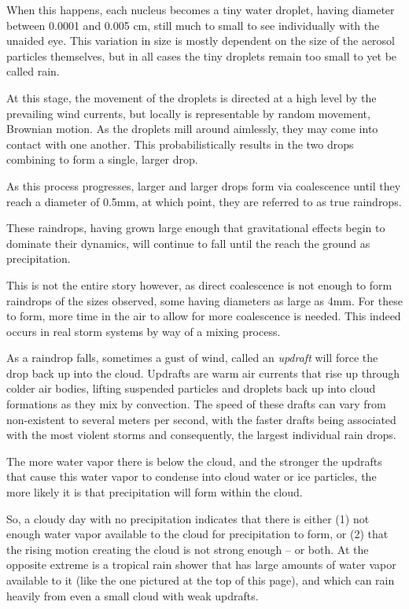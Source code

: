 \documentclass[twocolumn,a4paper,10pt]{article}
\begin{document}
When this happens, each nucleus becomes a tiny water droplet, having diameter
between 0.0001 and 0.005 cm, still much to small to see individually with the
unaided eye. This variation in size is mostly dependent on the size of the
aerosol particles themselves, but in all cases the tiny droplets remain too
small to yet be called rain.

At this stage, the movement of the droplets is directed at a high level by the
prevailing wind currents, but locally is representable by random movement,
Brownian motion. As the droplets mill around aimlessly, they may come into
contact with one another. This probabilistically results in the two drops
combining to form a single, larger drop.

As this process progresses, larger and larger drops form via coalescence until
they reach a diameter of 0.5mm, at which point, they are referred to as
true raindrops.

These raindrops, having grown large enough that gravitational effects begin to
dominate their dynamics, will continue to fall until the reach the ground as
precipitation.

This is not the entire story however, as direct coalescence is not enough to
form raindrops of the sizes observed, some having diameters as large as 4mm. For
these to form, more time in the air to allow for more coalescence is needed.
This indeed occurs in real storm systems by way of a mixing process.

As a raindrop falls, sometimes a gust of wind, called an \emph{updraft} will
force the drop back up into the cloud.  Updrafts are warm air currents that rise
up through colder air bodies, lifting suspended particles and droplets back up
into cloud formations as they mix by convection. The speed of these drafts can
vary from non-existent to several meters per second, with the faster drafts
being associated with the most violent storms and consequently, the largest
individual rain drops.


The more water vapor there is below the cloud, and the stronger the updrafts
that cause this water vapor to condense into cloud water or ice particles, the
more likely it is that precipitation will form within the cloud. 

So, a cloudy day with no precipitation indicates that there is either (1) not
enough water vapor available to the cloud for precipitation to form, or (2) that
the rising motion creating the cloud is not strong enough -- or both.     At the
opposite extreme is a tropical rain shower that has large amounts of water vapor
available to it (like the one pictured at the top of this page), and which can
rain heavily from even a small cloud with weak updrafts. 
\end{document}
